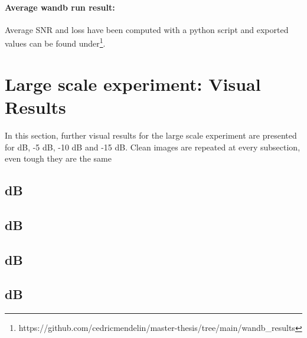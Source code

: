 \paragraph{Average wandb run result:}
Average SNR and loss have been computed with a python script and exported values can be found under\footnote{https://github.com/cedricmendelin/master-thesis/tree/main/wandb\_results}.

\clearpage
\section{Large scale experiment: Visual Results}
\label{sec:large_scale_visual_results}
In this section, further visual results for the large scale experiment are presented for 
 dB, -5 dB, -10 dB and -15 dB.
Clean images are repeated at every subsection, even tough they are the same

\subsection{ dB}

\clearpage

\subsection{ dB}

\clearpage

\subsection{ dB}

\clearpage
\subsection{ dB}
